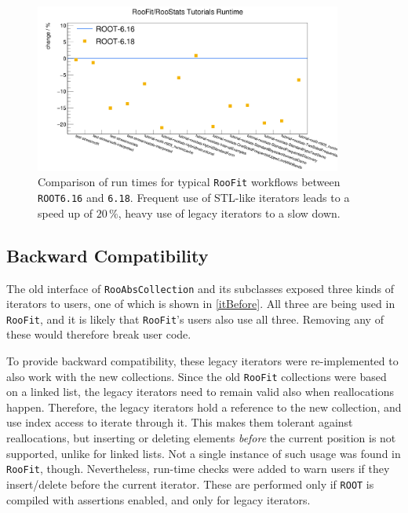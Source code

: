 \documentclass[a4paper]{jpconf}
\newcommand{\RooFit}{\texttt{RooFit}\xspace}
\newcommand{\ROOT}{\texttt{ROOT}\xspace}
\begin{document}
\begin{figure}[t]
\begin{center}
\includegraphics[trim=0 0 20mm 0,clip,width=0.9\textwidth]{tutorialsSpeed.png}
\end{center}
\caption{\label{speedupSTL}%
Comparison of run times for typical \RooFit workflows between \ROOT \texttt{6.16} and \texttt{6.18}. Frequent use of STL-like iterators leads to a
speed up of $20\,\%$, heavy use of legacy iterators to a slow down.
}
\end{figure}

\subsection{Backward Compatibility}
The old interface of \texttt{RooAbsCollection} and its subclasses exposed three kinds of iterators to users, one of which
is shown in \cref{itBefore}. All three are being used in \RooFit, and it is likely that \RooFit's users also use all three.
Removing any of these would therefore break user code.

To provide backward compatibility, these legacy iterators were re-implemented to also work with the new collections. Since the old \RooFit
collections were based on a linked list, the legacy iterators need to remain valid also when reallocations happen.
Therefore, the legacy iterators hold a reference to the new collection, and use index access to
iterate through it. This makes them tolerant against reallocations, but inserting or deleting elements \textit{before} the current
position is not supported, unlike for linked lists. Not a single instance of such usage was found in \RooFit, though. Nevertheless, run-time checks were added
to warn users if they insert/delete before the current iterator. These are performed only if \ROOT is compiled with assertions enabled, and only for legacy iterators.
\end{document}
